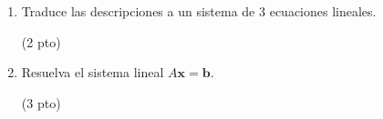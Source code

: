 \documentclass[12pt,letterpaper,landscape]{article}
\begin{document}
\begin{enumerate}
        \begin{enumerate}         
            \item Traduce las descripciones a un sistema de 3 ecuaciones lineales.
            \begin{flushright}{(2 pto)}\end{flushright}
            \item Resuelva el sistema lineal $A\mathbf{x} = \mathbf{b}$.
            \begin{flushright}{(3 pto)}\end{flushright}
        \end{enumerate}

	\end{enumerate}
\end{document}
